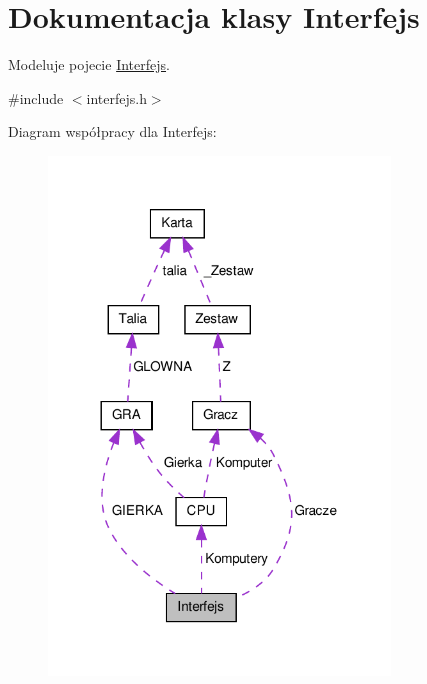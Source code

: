 \hypertarget{class_interfejs}{\section{Dokumentacja klasy Interfejs}
\label{class_interfejs}
}


Modeluje pojecie \hyperlink{class_interfejs}{Interfejs}.  




{\ttfamily \#include $<$interfejs.\-h$>$}



Diagram współpracy dla Interfejs\-:\nopagebreak
\begin{figure}[H]
\begin{center}
\leavevmode
\includegraphics[width=257pt]{class_interfejs__coll__graph}
\end{center}
\end{figure}
